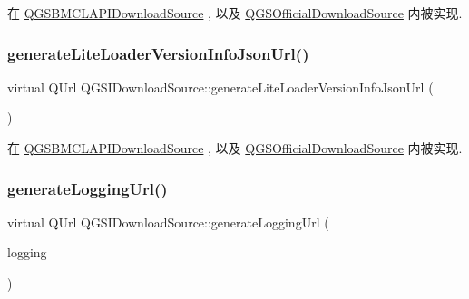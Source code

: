 在 \mbox{\hyperlink{class_q_g_s_b_m_c_l_a_p_i_download_source_aa6f61651ab57891bc245672c5e184512}{Q\+G\+S\+B\+M\+C\+L\+A\+P\+I\+Download\+Source}} , 以及 \mbox{\hyperlink{class_q_g_s_official_download_source_a78f454b773647b61aa748f5be9b10ba1}{Q\+G\+S\+Official\+Download\+Source}} 内被实现.

\mbox{\label{class_q_g_s_i_download_source_a276656b21753de8384d457def7c23701}} 
\subsubsection{\texorpdfstring{generate\+Lite\+Loader\+Version\+Info\+Json\+Url()}{generateLiteLoaderVersionInfoJsonUrl()}}
{\footnotesize\ttfamily virtual Q\+Url Q\+G\+S\+I\+Download\+Source\+::generate\+Lite\+Loader\+Version\+Info\+Json\+Url (\begin{DoxyParamCaption}{ }\end{DoxyParamCaption})\hspace{0.3cm}{\ttfamily [pure virtual]}}



在 \mbox{\hyperlink{class_q_g_s_b_m_c_l_a_p_i_download_source_a8c41976a4494c944c9db91dbd6ff7bb7}{Q\+G\+S\+B\+M\+C\+L\+A\+P\+I\+Download\+Source}} , 以及 \mbox{\hyperlink{class_q_g_s_official_download_source_aab46bc9decd9cb2e2fe9e9d403d36575}{Q\+G\+S\+Official\+Download\+Source}} 内被实现.

\mbox{\label{class_q_g_s_i_download_source_aae93e5aba009f01df11cbbc6aacac96f}} 
\subsubsection{\texorpdfstring{generate\+Logging\+Url()}{generateLoggingUrl()}}
{\footnotesize\ttfamily virtual Q\+Url Q\+G\+S\+I\+Download\+Source\+::generate\+Logging\+Url (\begin{DoxyParamCaption}\item[{const \mbox{\hyperlink{class_q_g_s_logging}{Q\+G\+S\+Logging}} \&}]{logging }\end{DoxyParamCaption})\hspace{0.3cm}{\ttfamily [pure virtual]}}



